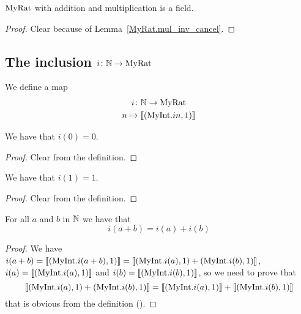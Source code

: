 \begin{proposition}
    \label{MyRat.field}
    \leanok
    $\mathrm{MyRat}$ with addition and multiplication is a field.
\end{proposition}
\begin{proof}
    \leanok
    Clear because of Lemma~\ref{MyRat.mul_inv_cancel}.
\end{proof}

\subsection{\texorpdfstring{The inclusion $i \colon \mathbb{N} \to \mathrm{MyRat}$}{The inclusion}}
\begin{definition}
    \label{MyRat.i}
    \leanok
    We define a map
\begin{gather*}
    i \colon \mathbb{N} \to \mathrm{MyRat} \\
    n \mapsto \llbracket (\mathrm{MyInt}.i n,1) \rrbracket
\end{gather*}
\end{definition}

\begin{lemma}
    \label{MyRat.i_zero}
    \leanok
We have that $i(0) = 0$.
\end{lemma}
\begin{proof}
    \leanok
Clear from the definition.
\end{proof}

\begin{lemma}
    \label{MyRat.i_one}
    \leanok
We have that $i(1) = 1$.
\end{lemma}
\begin{proof}
    \leanok
Clear from the definition.
\end{proof}

\begin{lemma}
    \label{MyRat.i_add}
    \leanok
For all $a$ and $b$ in $\mathbb{N}$ we have that
\[
i(a+b) = i(a) + i(b)
\]
\end{lemma}
\begin{proof}
    \leanok
    We have $i(a+b) = \llbracket (\mathrm{MyInt}.i (a+b), 1) \rrbracket = \llbracket (\mathrm{MyInt}.i (a), 1) + (\mathrm{MyInt}.i (b), 1) \rrbracket$, $i(a) = \llbracket (\mathrm{MyInt}.i(a), 1) \rrbracket$ and
    $i(b) = \llbracket (\mathrm{MyInt}.i (b), 1) \rrbracket$, so we need to prove that
\[
\llbracket (\mathrm{MyInt}.i (a), 1) + (\mathrm{MyInt}.i (b), 1) \rrbracket = \llbracket (\mathrm{MyInt}.i (a), 1) \rrbracket + \llbracket (\mathrm{MyInt}.i (b), 1) \rrbracket
\]
that is obvious from the definition ().
\end{proof}

